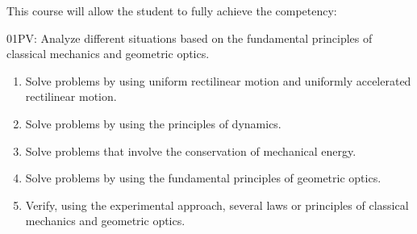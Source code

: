 {This course will allow the student to fully achieve the competency:\\
\smallskip

01PV: Analyze different situations based on the fundamental principles of classical mechanics and geometric optics.
\smallskip

\begin{enumerate}
\item Solve problems by using uniform rectilinear motion and uniformly accelerated rectilinear motion.
\item Solve problems by using the principles of dynamics.
\item Solve problems that involve the conservation of mechanical energy.
\item Solve problems by using the fundamental principles of geometric optics.
\item Verify, using the experimental approach, several laws or principles of classical mechanics and geometric optics.
\end{enumerate}
}
